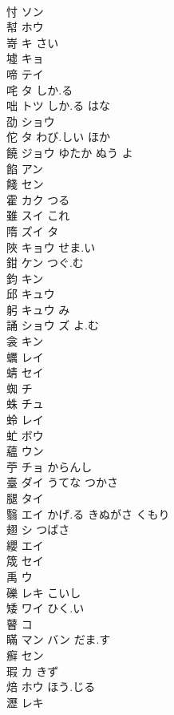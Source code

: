 \documentclass[8pt]{extreport}
\begin{document}
\begin{CJK}{UTF8}{min}
\\	忖	ソン			
\\	幇	ホウ			
\\	嵜	キ さい			
\\	墟	キョ			
\\	啼	テイ			
\\	咤	タ しか.る			
\\	咄	トツ しか.る はな			
\\	劭	ショウ			
\\	佗	タ わび.しい ほか			
\\	饒	ジョウ ゆたか ぬう よ			
\\	餡	アン			
\\	餞	セン			
\\	霍	カク つる			
\\	雖	スイ これ			
\\	隋	ズイ タ			
\\	陜	キョウ せま.い			
\\	鉗	ケン つぐ.む			
\\	鈞	キン			
\\	邱	キュウ			
\\	躬	キュウ み			
\\	誦	ショウ ズ よ.む			
\\	衾	キン			
\\	蠣	レイ			
\\	蜻	セイ			
\\	蜘	チ			
\\	蛛	チュ			
\\	蛉	レイ			
\\	虻	ボウ			
\\	蘊	ウン			
\\	苧	チョ からんし			
\\	臺	ダイ うてな つかさ			
\\	腿	タイ			
\\	翳	エイ かげ.る きぬがさ くもり			
\\	翅	シ つばさ			
\\	纓	エイ			
\\	筬	セイ			
\\	禹	ウ			
\\	礫	レキ こいし			
\\	矮	ワイ ひく.い			
\\	瞽	コ			
\\	瞞	マン バン だま.す			
\\	癬	セン			
\\	瑕	カ きず			
\\	焙	ホウ ほう.じる			
\\	瀝	レキ			

\end{CJK}
\end{document}
